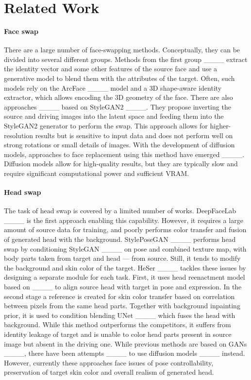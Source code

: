 \section{Related Work}
\paragraph{Face swap}
There are a large number of face-swapping methods. Conceptually, they can be divided into several different groups. Methods from the first group ____ extract the identity vector and some other features of the source face and use a generative model to blend them with the attributes of the target. Often, such models rely on the ArcFace ____ model and a 3D shape-aware identity extractor, which allows encoding the 3D geometry of the face.
There are also approaches ____ based on StyleGAN2 ____. They propose inverting the source and driving images into the latent space and feeding them into the StyleGAN2 generator to perform the swap. This approach allows for higher-resolution results but is sensitive to input data and does not perform well on strong rotations or small details of images.
With the development of diffusion models, approaches to face replacement using this method have emerged ____. Diffusion models allow for high-quality results, but they are typically slow and require significant computational power and sufficient VRAM.

\paragraph{Head swap}
The task of head swap is covered by a limited number of works. DeepFaceLab ____ is the first approach enabling this capability. However, it requires a large amount of source data for training, and poorly performs color transfer and fusion of generated head with the background. StylePoseGAN ____ performs head swap by conditioning StyleGAN ____ on pose and combined texture map, with body parts taken from target and head — from source. 
Still, it tends to modify the background and skin color of the target. HeSer ____ tackles these issues by designing a separate module for each task. First, it uses head reenactment model based on ____ to align source head with target in pose and expression. In the second stage a reference is created for skin color transfer based on correlation between pixels from the same head parts. Together with background inpainting prior, it is used to condition blending UNet ____ which fuses the head with background. While this method outperforms the competitors, it suffers from identity leakage of target and is unable to color head parts present in source image but absent in the driving one.  
While previous methods are based on GANs ____, there have been attempts ____ to use diffusion models ____ instead. However, currently these approaches face issues of pose controllability, preservation of target skin color and overall realism of generated head.


